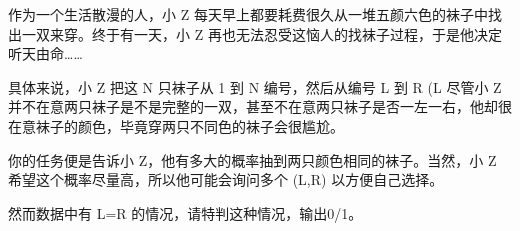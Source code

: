 作为一个生活散漫的人，小 Z 每天早上都要耗费很久从一堆五颜六色的袜子中找出一双来穿。终于有一天，小 Z 再也无法忍受这恼人的找袜子过程，于是他决定听天由命……

具体来说，小 Z 把这 N 只袜子从 1 到 N 编号，然后从编号 L 到 R (L 尽管小 Z 并不在意两只袜子是不是完整的一双，甚至不在意两只袜子是否一左一右，他却很在意袜子的颜色，毕竟穿两只不同色的袜子会很尴尬。

你的任务便是告诉小 Z，他有多大的概率抽到两只颜色相同的袜子。当然，小 Z 希望这个概率尽量高，所以他可能会询问多个 (L,R) 以方便自己选择。

然而数据中有 L=R 的情况，请特判这种情况，输出0/1。